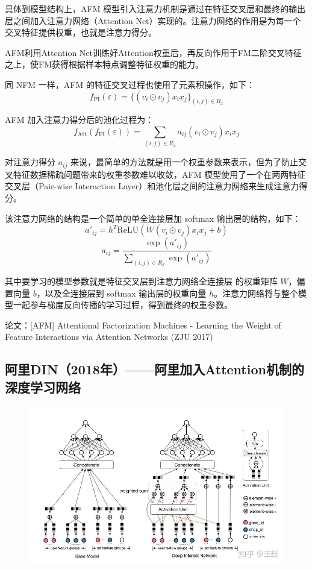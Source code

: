 \documentclass[12pt]{article}
\begin{document}
具体到模型结构上，AFM 模型引入注意力机制是通过在特征交叉层和最终的输出层之间加入注意力网络（Attention Net）实现的。注意力网络的作用是为每一个交叉特征提供权重，也就是注意力得分。

AFM利用Attention Net训练好Attention权重后，再反向作用于FM二阶交叉特征之上，使FM获得根据样本特点调整特征权重的能力。

同 NFM 一样，AFM 的特征交叉过程也使用了元素积操作，如下：
$$
f_{\text{PI}}(\varepsilon) = \{(v_i \odot v_j) x_i x_j\}_{(i,j) \in R_x}
$$

AFM 加入注意力得分后的池化过程为：
$$
f_{\text{Att}}(f_{\text{PI}}(\varepsilon)) = \sum_{(i,j) \in R_x}a_{ij}(v_i \odot v_j) x_ix_j
$$

对注意力得分 $a_{ij}$ 来说，最简单的方法就是用一个权重参数来表示，但为了防止交叉特征数据稀疏问题带来的权重参数难以收敛，AFM 模型使用了一个在两两特征交叉层（Pair-wise Interaction Layer）和池化层之间的注意力网络来生成注意力得分。

该注意力网络的结构是一个简单的单全连接层加 softmax 输出层的结构，如下：
$$
a'_{ij} = h^T \text{ReLU} (W(v_i \odot v_j)x_ix_j + b)
$$
$$
a_{ij} = \frac{\exp(a'_{ij})}{\sum_{(i,j) \in R_x}\exp(a'_{ij})}
$$

其中要学习的模型参数就是特征交叉层到注意力网络全连接层
的权重矩阵 $W$，偏置向量 $b$，以及全连接层到 softmax 输出层的权重向量 $h$。注意力网络将与整个模型一起参与梯度反向传播的学习过程，得到最终的权重参数。

论文：[AFM] Attentional Factorization Machines - Learning the Weight of Feature Interactions via Attention Networks (ZJU 2017)

\subsection{阿里DIN（2018年）——阿里加入Attention机制的深度学习网络}
\begin{figure}[H]
    \centering
    \includegraphics[width=.8\textwidth]{fig/Ali_DIN_Structure.jpg}
\end{figure}
\end{document}
